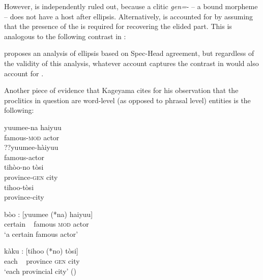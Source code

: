 \documentclass[output=paper]{LSP/langsci}
\begin{document}
However,  is independently ruled out, because a clitic \textit{gen=}{}- -- a bound morpheme -- does not have a host after ellipsis. Alternatively,  is accounted for by assuming that the presence of the  is required for recovering the elided part. This is analogous to the following contrast in :

\ea\label{ex:nishiyama:39}
\z \z

\citet{Lobeck1990} proposes an analysis of ellipsis based on Spec-Head agreement, but regardless of the validity of this analysis, whatever account captures the contrast in  would also account for .

  Another piece of evidence that Kageyama cites for his observation that the proclitics in question are word-level (as opposed to phrasal level) entities is the following:

\ea\label{ex:nishiyama:40}
 \ea 
\gll  yuumee-na     haiyuu   \\
    famous-\textsc{mod}    actor\\

 \ex
\gll   ??yuumee-hàiyuu\\
        {\db}{\db}famous-actor\\
  \ex
\gll  tihòo-no     tòsi   \\ 
    province-\textsc{gen} city   \\

  \ex
\gll   tihoo-tòsi\\
     province-city\\
\z \z

\ea\label{ex:nishiyama:41}
 \ea  
\gll bòo : [yuumee (*na) haiyuu]\\
    certain ~ famous \textsc{mod} actor\\
\glt ‘a certain famous actor’

  \ex 
\gll  kàku : [tihoo (*no) tòsi] \\
    each ~ province \textsc{gen} city\\
\glt ‘each provincial city’      (\citealt[249f]{Kageyama2001})
\z \z
\end{document}

